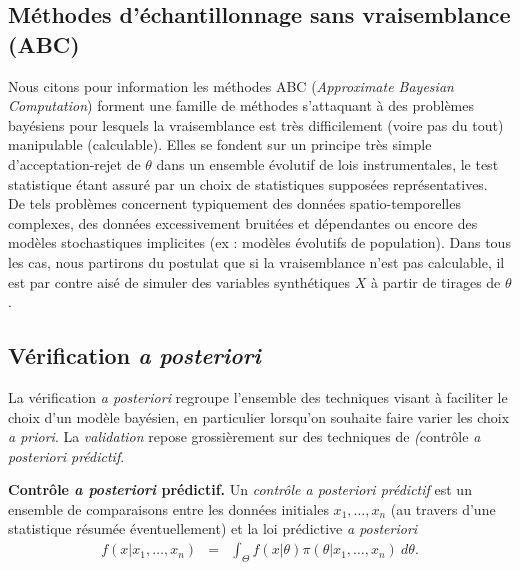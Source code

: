 \subsection{Méthodes d'échantillonnage sans vraisemblance (ABC)}

Nous citons pour information les méthodes ABC (\textit{Approximate Bayesian Computation}) forment une famille de méthodes s'attaquant à des problèmes bayésiens pour lesquels la vraisemblance est très difficilement (voire pas du tout) manipulable (calculable). Elles se fondent sur un principe très simple d'acceptation-rejet de $\theta$ dans un ensemble évolutif de lois instrumentales, le test statistique étant assuré par un choix de statistiques supposées représentatives. \\

De tels problèmes concernent typiquement des  données spatio-temporelles complexes, des données excessivement bruitées et dépendantes ou encore des modèles stochastiques implicites (ex : modèles évolutifs de population). Dans tous les cas, nous partirons du postulat que si la vraisemblance n'est pas calculable, il est par contre aisé de simuler des variables synthétiques $X$ à partir de tirages de $\theta$. \\







\subsection{Vérification {\it a posteriori}}

La vérification {\it a posteriori} regroupe l'ensemble des techniques visant à faciliter le choix d'un modèle bayésien, en particulier lorsqu'on souhaite faire varier les choix {\it a priori}. La \emph{validation} repose grossièrement sur des techniques de \emph(contrôle {\it a posteriori prédictif}. 

\begin{definition}{\bf Contrôle {\it a posteriori} prédictif.}
Un  \emph{contrôle a posteriori prédictif} est un ensemble de comparaisons entre les données initiales $x_1,\ldots,x_n$ (au travers d'une statistique résumée éventuellement) et la loi prédictive {\it a posteriori}
\begin{eqnarray*}
f(x|x_1,\ldots,x_n) & = & \int_{\Theta} f(x|\theta) \pi(\theta|x_1,\ldots,x_n) \ d\theta.
\end{eqnarray*}
\end{definition}


